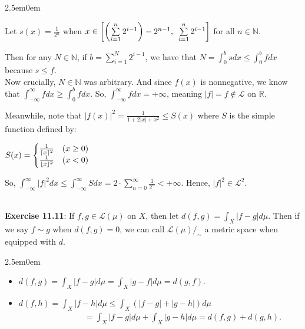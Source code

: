 \documentclass{book}
\newcommand{\exTwo}{%
   \color{RedViolet}%
   \fontsize{13}{15}\selectfont%
}
\newenvironment{myIndent}{%
   \begin{adjustwidth}{2.5em}{0em}%
}{%
   \end{adjustwidth}%
}
\newcommand{\myHS}{ \hspace{0.5em}}
\newcommand{\mySepTwo}[1][.]{%
   {\noindent\color{#1}{\rule{6.5in}{0.5mm}}}\\%
}
\newcommand{\retTwo}{\hfill\bigbreak}
\begin{document}
{\begin{myIndent}\exTwo
   Let $s(x) = \frac{1}{2^n}$ when $x \in \left[\left(\sum\limits_{i=1}^n 2^{i-1}\right) - 2^{n-1}, \myHS \sum\limits_{i=1}^n 2^{i-1}\right]$ for all $n \in \mathbb{N}$.

   \newpage

   Then for any $N \in \mathbb{N}$, if $b = \sum\limits_{i=1}^N 2^{i-1}$, we have that $N = \int_0^b sdx \leq \int_0^b fdx$\\ [-7pt] because $s \leq f$.\\ [2pt]

   Now crucially, $N \in \mathbb{N}$ was arbitrary. And since $f(x)$ is nonnegative, we know\\ that $\int_{-\infty}^{\infty} fdx \geq \int_0^b fdx$. So, $\int_{-\infty}^{\infty}fdx = +\infty$, meaning $|f| = f \notin \mathscr{L}$ on $\mathbb{R}$.\retTwo

   Meanwhile, note that $|f(x)|^2 = \frac{1}{1 + 2|x| + x^2} \leq S(x)$ where $S$ is the simple\\ function defined by:
   
   {\centering $S(x) = \left\{
   \begin{matrix}
      \frac{1}{\lceil x \rceil^{2\vphantom{|}}} & (x \geq 0) \\ \frac{1}{\lfloor x \rfloor^{2\vphantom{|}}} & (x < 0)
   \end{matrix}\right.$\retTwo\par}

   So, $\int_{-\infty}^\infty |f|^2dx \leq \int_{-\infty}^\infty Sdx = 2\cdot \sum\limits_{n=0}^\infty \frac{1}{2^n} < +\infty$. Hence, $|f|^2 \in \mathscr{L}^2$.
   \retTwo
\end{myIndent}}

\mySepTwo

\textbf{Exercise 11.11}: If $f, g \in \mathscr{L}(\mu)$ on $X$, then let $d(f, g) = \int_X |f-g|d\mu$. Then if\\ we say $f \sim g$ when $d(f, g) = 0$, we can call ${\mathscr{L}(\mu)}/_\sim$ a metric space when\\ equipped with $d$.\\ [-11pt]

{\begin{myIndent}\exTwo
   \begin{itemize}
      \item $d(f, g) = \int_X |f-g|d\mu = \int_X |g-f|d\mu = d(g, f)$.
      \item
         $d(f, h) = \int_X |f - h|d\mu \leq \int_X (|f-g| + |g-h|)d\mu$\\ [3pt]
         $\phantom{aaaaaaaaaaaaaaa} = \int_X |f-g|d\mu + \int_X |g-h|d\mu = d(f, g) + d(g, h)$.\retTwo
   \end{itemize}
\end{myIndent}}
\end{document}
